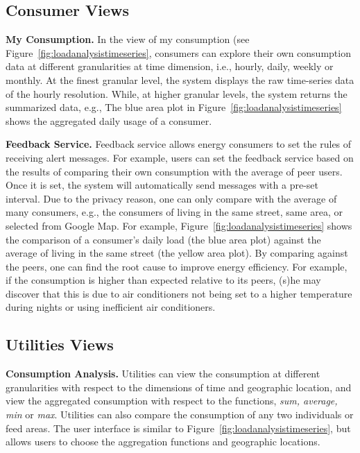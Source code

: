 \documentclass{sig-alternate}
\newcommand{\ie}{i.e.}
\newcommand{\eg}{e.g.}
\begin{document}
\subsection{Consumer Views}
{\bf My Consumption.}
In the view of my  consumption (see Figure~\ref{fig:loadanalysistimeseries}, consumers can explore their own consumption data at different granularities at time dimension, \ie, hourly, daily, weekly or monthly. At the finest granular level, the system displays the raw time-series data of the hourly resolution. While, at higher granular levels, the system returns the summarized  data, \eg, The blue area plot in Figure~\ref{fig:loadanalysistimeseries} shows the aggregated daily usage of a consumer. 

{\bf Feedback Service.}
Feedback service allows energy consumers to set the rules of receiving alert messages. For example, users can set the feedback service based on the results of comparing their own consumption with the average of peer users. Once it is set, the system will automatically send messages with a pre-set  interval. Due to the privacy reason, one can only compare with the average of many  consumers, \eg, the consumers of living in the same street, same area, or selected from Google Map.  For example, Figure~\ref{fig:loadanalysistimeseries} shows the comparison of a consumer's daily load (the blue area plot) against the average of living in the same street (the yellow area plot). By comparing against  the peers, one can find the root cause to improve  energy efficiency. For example, if the consumption is higher than expected relative to its peers, (s)he may discover that this is due to air conditioners not being set to a higher temperature during nights or using  inefficient air conditioners. 


\subsection{Utilities Views}
{\bf Consumption Analysis.}  Utilities can view the consumption at different granularities with respect to the dimensions of time and geographic location, and view the aggregated consumption with respect to the functions, {\em sum, average, min} or {\em max}.  Utilities can also compare the consumption of any two individuals or feed areas. The user interface is similar to Figure~\ref{fig:loadanalysistimeseries}, but allows users to choose the aggregation functions and geographic locations.  
\end{document}
